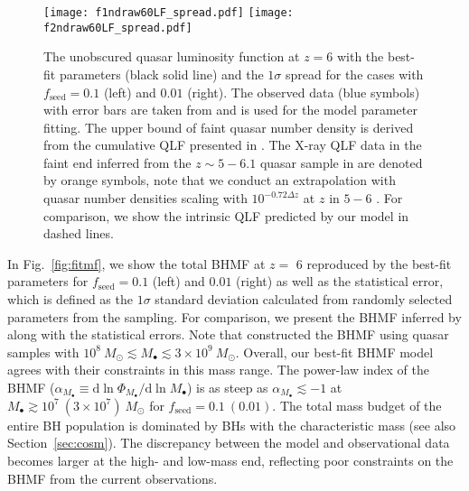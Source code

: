 \documentclass[twocolumn, twocolappendix]{aastex63}
\newcommand{\Msun}{M_\odot}
\newcommand{\Mbh}{M_\bullet}
\newcommand{\fseed}{f_\mathrm{seed}}
\newcommand{\D}{\mathrm{d}}
\begin{document}
\begin{CJK*}{UTF8}{gbsn}
\begin{figure*}
\centering
\texttt{[image: f1ndraw60LF\_spread.pdf]}\hspace{3mm}
\texttt{[image: f2ndraw60LF\_spread.pdf]}
\caption{
The unobscured quasar luminosity function at $z=6$ with the best-fit parameters (black solid line) and the $1\sigma$ spread for the cases with $\fseed=0.1$ (left) and $0.01$ (right).
The observed data (blue symbols) with error bars are taken from  and is used for the model parameter fitting.
The upper bound of faint quasar number density is derived from the cumulative QLF presented in \citet{2022NatAs...6..850J}.
The X-ray QLF data in the faint end inferred from the $z\sim 5-6.1$ quasar sample in \citet{2019ApJ...884...19G} are denoted by orange symbols,
note that we conduct an extrapolation with quasar number densities scaling with $10^{-0.72\Delta z}$ at $z$ in $5-6$ \citep{2016ApJ...833..222J}.
For comparison, we show the intrinsic QLF predicted by our model in dashed lines.
}
\label{fig:fitlf}
\vspace{2mm}
\end{figure*}



In Fig.~\ref{fig:fitmf}, we show the total BHMF at $z=$ 6 reproduced by the best-fit parameters for 
$\fseed = 0.1$ (left) and $0.01$ (right) as well as the statistical error, 
which is defined as the $1\sigma$ standard deviation calculated from randomly selected parameters from the sampling.
For comparison, we present the BHMF inferred by  along with the statistical errors.
Note that  constructed the BHMF using quasar samples with 
$10^8~\Msun \lesssim \Mbh \lesssim 3\times 10^9~\Msun$.
Overall, our best-fit BHMF model agrees with their constraints in this mass range.
The power-law index of the BHMF ($\alpha_{M_\bullet} \equiv \D \ln \Phi_{M_\bullet}/\D \ln M_\bullet$) is as steep as $\alpha_{M_\bullet}\lesssim -1$
at $M_\bullet \gtrsim 10^7~(3\times 10^7)~\Msun$ for $\fseed = 0.1 ~(0.01)$.
The total mass budget of the entire BH population is dominated by BHs with the characteristic mass (see also Section~\ref{sec:cosm}). 
The discrepancy between the model and observational data becomes larger at the high- and low-mass end,
reflecting poor constraints on the BHMF from the current observations.



\end{CJK*}
\end{document}
